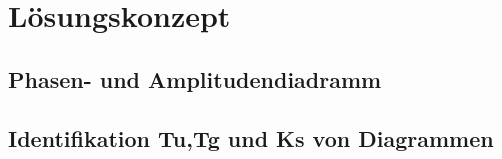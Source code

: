 \section{Lösungskonzept}
\subsection{Phasen- und Amplitudendiadramm}
\subsection{Identifikation Tu,Tg und Ks  von Diagrammen}